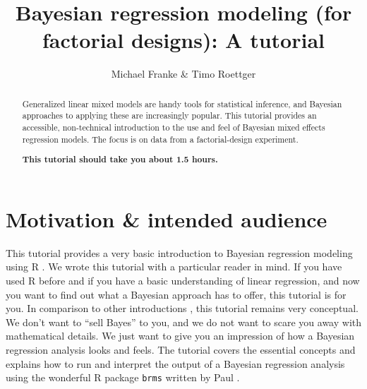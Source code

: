 \documentclass[nobib]{tufte-handout}
\title{Bayesian regression modeling (for factorial designs): A tutorial}
\author{Michael Franke \& Timo Roettger}
\date{}
\begin{document}
\maketitle

\begin{abstract}
  \noindent Generalized linear mixed models are handy tools for statistical inference, and Bayesian approaches to applying these are increasingly popular. This tutorial provides an accessible, non-technical introduction to the use and feel of Bayesian mixed effects regression models. The focus is on data from a factorial-design experiment. \\
  
  \medskip
  
  \noindent \textbf{This tutorial should take you about 1.5 hours.}
\end{abstract} 

\section{Motivation \& intended audience}

This tutorial provides a very basic introduction to Bayesian regression modeling using R \citep{Manual}. We wrote this tutorial with a particular reader in mind. If you have used R before and if you have a basic understanding of linear regression, and now you want to find out what a Bayesian approach has to offer, this tutorial is for you. In comparison to other introductions \citep[e.g.][]{SorensenHohensteinb2016:Bayesian-linear}, this tutorial remains very conceptual. We don’t want to ``sell Bayes'' to you, and we do not want to scare you away with mathematical details. We just want to give you an impression of how a Bayesian regression analysis looks and feels. The tutorial covers the essential concepts and explains how to run and interpret the output of a Bayesian regression analysis using the wonderful R package \texttt{brms} written by Paul \citet{buerkner2016brms}.


\end{document}
